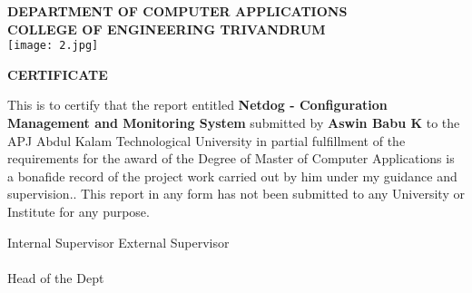 \begin{titlepage}
\begin{center}

\textbf{DEPARTMENT OF COMPUTER APPLICATIONS}\\[0.5cm]
\textbf{COLLEGE OF ENGINEERING TRIVANDRUM}\\
[0.5cm]

\vspace{1.2cm}
\texttt{[image: 2.jpg]}\\
\vspace{0.8cm}

\large
\textbf{CERTIFICATE}\\
\end{center}

This is to certify that the report entitled 
\textbf{Netdog - Configuration Management and Monitoring System} submitted by
\textbf{Aswin Babu K} to the APJ Abdul Kalam Technological University in partial
fulfillment of the requirements for the award of the Degree of Master of
Computer Applications is a bonafide record of the project work carried out by
him under my guidance and supervision.. This report in any form has not been
submitted to any University or Institute for any purpose.

\vspace{1 cm}

\noindent Internal Supervisor 
\hfill External Supervisor
\\ \\
Head of the Dept

\end{titlepage}
